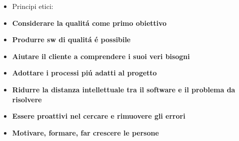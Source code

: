 \documentclass[10pt]{article}
\begin{document}
\begin{itemize}
SWE != PROGRAMMING, la programmazione \'e solo un elemento, e anche il meno
importante. Il
programmatore deve fare solo quello che viene chiesto (da un membro del team
stesso). Il programmatore
deve obbedire, non pu\'o essere creativo.


\item Principi etici:
\item \textbf{Considerare la qualit\'a come primo obiettivo}
\item \textbf{Produrre sw di qualit\'a \'e possibile}
\item \textbf{Aiutare il cliente a comprendere i suoi veri bisogni}
\item \textbf{Adottare i processi pi\'u adatti al progetto}
\item \textbf{Ridurre la distanza intellettuale tra il software e il problema da
risolvere}
\item \textbf{Essere proattivi nel cercare e rimuovere gli errori}
\item \textbf{Motivare, formare, far crescere le persone}

\end {itemize}
\end{document}
